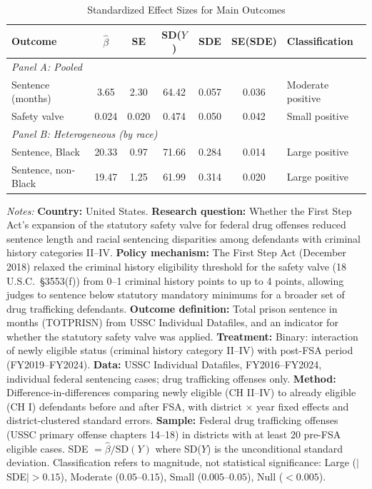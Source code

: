 \begin{table}[H]
\centering
\caption{Standardized Effect Sizes for Main Outcomes}
\label{tab:sde}
\begin{threeparttable}
\begin{tabular}{lcccccl}
\toprule
Outcome & $\hat{\beta}$ & SE & SD($Y$) & SDE & SE(SDE) & Classification \\
\midrule
\multicolumn{7}{l}{\textit{Panel A: Pooled}} \\
Sentence (months) & 3.65 & 2.30 & 64.42 & 0.057 & 0.036 & Moderate positive \\
Safety valve & 0.024 & 0.020 & 0.474 & 0.050 & 0.042 & Small positive \\
\midrule
\multicolumn{7}{l}{\textit{Panel B: Heterogeneous (by race)}} \\
Sentence, Black & 20.33 & 0.97 & 71.66 & 0.284 & 0.014 & Large positive \\
Sentence, non-Black & 19.47 & 1.25 & 61.99 & 0.314 & 0.020 & Large positive \\
\bottomrule
\end{tabular}
\begin{tablenotes}[flushleft]
\small
\item \textit{Notes:} \textbf{Country:} United States. \textbf{Research question:} Whether the First Step Act's expansion of the statutory safety valve for federal drug offenses reduced sentence length and racial sentencing disparities among defendants with criminal history categories II--IV. \textbf{Policy mechanism:} The First Step Act (December 2018) relaxed the criminal history eligibility threshold for the safety valve (18 U.S.C.\ \S3553(f)) from 0--1 criminal history points to up to 4 points, allowing judges to sentence below statutory mandatory minimums for a broader set of drug trafficking defendants. \textbf{Outcome definition:} Total prison sentence in months (TOTPRISN) from USSC Individual Datafiles, and an indicator for whether the statutory safety valve was applied. \textbf{Treatment:} Binary: interaction of newly eligible status (criminal history category II--IV) with post-FSA period (FY2019--FY2024). \textbf{Data:} USSC Individual Datafiles, FY2016--FY2024, individual federal sentencing cases; drug trafficking offenses only. \textbf{Method:} Difference-in-differences comparing newly eligible (CH II--IV) to already eligible (CH I) defendants before and after FSA, with district $\times$ year fixed effects and district-clustered standard errors. \textbf{Sample:} Federal drug trafficking offenses (USSC primary offense chapters 14--18) in districts with at least 20 pre-FSA eligible cases. SDE $= \hat{\beta} / \text{SD}(Y)$ where SD($Y$) is the unconditional standard deviation. Classification refers to magnitude, not statistical significance: Large ($|$SDE$| > 0.15$), Moderate ($0.05$--$0.15$), Small ($0.005$--$0.05$), Null ($< 0.005$). 
\end{tablenotes}
\end{threeparttable}
\end{table}
